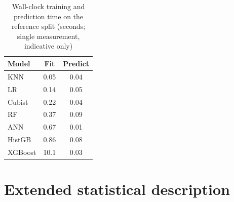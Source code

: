 \documentclass[12pt]{article}
\begin{document}
\begin{table}[h]
\centering
\caption{Wall-clock training and prediction time on the reference split
(seconds; single measurement, indicative only)}
\begin{tabular}{lcc}
\toprule
Model & Fit & Predict \\
\midrule
KNN & 0.05 & 0.04 \\
LR & 0.14 & 0.05 \\
Cubist & 0.22 & 0.04 \\
RF & 0.37 & 0.09 \\
ANN & 0.67 & 0.01 \\
HistGB & 0.86 & 0.08 \\
XGBoost & 10.1 & 0.03 \\
\bottomrule
\end{tabular}
\end{table}

\section{Extended statistical description}
\end{document}
